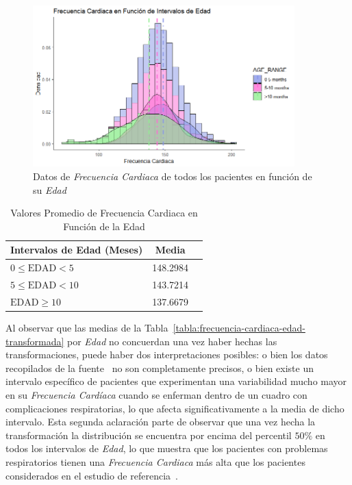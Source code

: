 \begin{figure}[H]
    \centering
    \includegraphics[width=0.9\textwidth]{img/frecuencia-cardiaca-edad.png}
    \caption{Datos de \textit{Frecuencia Cardiaca} de todos los pacientes en función de su \textit{Edad}}
    \label{fig:frecuencia-cardiaca-edad}
\end{figure}

\begin{table}[H]
    \centering
    \begin{tabular}{lcc}
        \toprule
        \textbf{Intervalos de Edad (Meses)} & \textbf{Media} \\
        \midrule
        $0 \leq \text{EDAD} < 5$ & 148.2984 \\
        $5 \leq \text{EDAD} < 10$ & 143.7214 \\
        $\text{EDAD} \geq 10$ & 137.6679 \\
        \bottomrule
    \end{tabular}
    \caption{Valores Promedio de Frecuencia Cardiaca en Función de la Edad}
    \label{tabla:frecuencia-cardiaca-edad}
\end{table}

Al observar que las medias de la Tabla~\ref{tabla:frecuencia-cardiaca-edad-transformada} por \textit{Edad} no concuerdan una vez haber hechas las transformaciones, puede haber dos interpretaciones posibles: o bien los datos recopilados de la fuente~\cite{percentilesFenton2015} no son completamente precisos, o bien existe un intervalo específico de pacientes que experimentan una variabilidad mucho mayor en su \textit{Frecuencia Cardíaca} cuando se enferman dentro de un cuadro con complicaciones respiratorias, lo que afecta significativamente a la media de dicho intervalo. Esta segunda aclaración parte de observar que una vez hecha la transformación la distribución se encuentra por encima del percentil $50\%$ en todos los intervalos de \textit{Edad}, lo que muestra que los pacientes con problemas respiratorios tienen una \textit{Frecuencia Cardiaca} más alta que los pacientes considerados en el estudio de referencia~\cite{percentilesFenton2015}.

